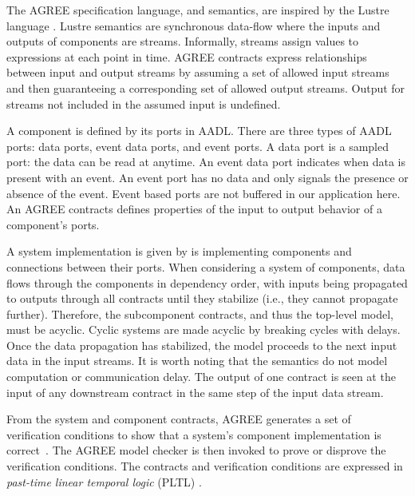 
\newcommand{\globally}{\konst{Always}}
\newcommand{\historically}{\konst{Hist}}
\newcommand{\assumes}{\ensuremath{A}}
\newcommand{\guarantees}{\ensuremath{P}}
\newcommand{\inputs}{\ensuremath{I}}
\newcommand{\outputs}{\ensuremath{O}}
\newcommand{\components}{\ensuremath{C}}
\newcommand{\component}{\ensuremath{c}}

The AGREE specification language, and semantics, are inspired by the Lustre language \cite{10.1145/41625.41641}.
Lustre semantics are synchronous data-flow where the inputs and outputs of
components are streams.
Informally, streams assign values to expressions at each point in time.
AGREE contracts express relationships between input and output streams by assuming a set of allowed input streams and then guaranteeing a corresponding set of allowed output streams.
Output for streams not included in the assumed input is undefined. 

A component is defined by its ports in AADL.
There are three types of AADL ports: data ports, event data ports, and event ports.
A data port is a sampled port: the data can be read at anytime.
An event data port indicates when data is present with an event.
An event port has no data and only signals the presence or absence of the event.
Event based ports are not buffered in our application here.
An AGREE contracts defines properties of the input to output behavior of a component's ports.

A system implementation is given by is implementing components and connections between their ports.
When considering a system of components,
data flows through the components in dependency order, with inputs
being propagated to outputs through all contracts until they stabilize
(i.e., they cannot propagate further). Therefore, the subcomponent contracts, and
thus the top-level model, must be acyclic. 
Cyclic systems are made acyclic by breaking cycles with delays.
Once the data propagation
has stabilized, the model proceeds to the next input data in the input
streams. It is worth noting that the semantics do not model computation or communication
delay. The output of one contract is seen at the input of any
downstream contract in the same step of the input data stream.

From the system and component contracts, AGREE generates a set of
verification conditions to show that a system's component
implementation is correct~\cite{agree2013}.  The AGREE model checker
is then invoked to prove or disprove the verification
conditions. The contracts and verification conditions are expressed in
\emph{past-time linear temporal logic} (PLTL) \cite{10.1093/jigpal/8.1.55}.


